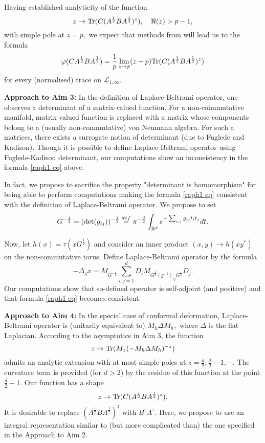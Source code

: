 \documentclass{article}
\begin{document}
Having established analyticity of the function
$$z\to {\rm Tr}(C(A^{\frac12}BA^{\frac12})^z),\quad \Re(z)>p-1,$$
with simple pole at $z=p,$ we expect that methods from \cite{SUZ-indiana} will lead us to the formula
$$\varphi(CA^{\frac12}BA^{\frac12})=\frac1p\lim_{z\to p}(z-p){\rm Tr}(C(A^{\frac12}BA^{\frac12})^z)$$
for every (normalised) trace on $\mathcal{L}_{1,\infty}.$

{\bf Approach to Aim 3:} In the definition of Laplace-Beltrami operator, one observes a determinant of a matrix-valued function. For a non-coimmutative manifold, matrix-valued function is replaced with a matrix whose components belong to a (usually non-commutative) von Neumann algebra. For such a matrices, there exists a surrogate notion of determinant (due to Fuglede and Kadison). Though it is possible to define Laplace-Beltrami operator using Fuglede-Kadison determinant, our computations show an inconsistency in the formula \eqref{raph1 eq} above.

In fact, we propose to sacrifice the property "determinant is homomorphism" for being able to perform computations making the formula \eqref{raph1 eq} consistent with the definition of Laplace-Beltrami operator. We propose to set 
$$G^{-\frac12}=({\rm det}(g_{ij}))^{-\frac12}\stackrel{def}{=}\pi^{-\frac{d}{2}}\int_{\mathbb{R}^d}e^{-\sum_{i,j}g_{ij}t_it_j}dt.$$

Now, let $h(x)=\tau(xG^{\frac12})$ and consider an inner product $(x,y)\to h(xy^*)$ on the non-commutative torus. Define Laplace-Beltrami operator by the formula
$$-\Delta_g x=M_{G^{-\frac12}}\sum_{i,j=1}^dD_iM_{G^{\frac14}(g^{-1})_{ij}G^{\frac14}}D_j.$$
Our computations show that so-defined operator is self-adjoint (and positive) and that formula \eqref{raph1 eq} becomes consistent.

{\bf Approach to Aim 4:} In the special case of conformal deformation, Laplace-Beltrami operator is (unitarily equivalent to) $M_h\Delta M_h,$ where $\Delta$ is the flat Laplacian. According to the asymptotics in Aim 3, the function
$$z\to {\rm Tr}(M_x(-M_h\Delta M_h)^{-z})$$
admits an analytic extension with at most simple poles at $z=\frac{d}{2},\frac{d}{2}-1,\cdots.$ The curvature term is provided (for $d>2$) by the residue of this function at the point $\frac{d}{2}-1.$ Our function has a shape
$$z\to {\rm Tr}(C(A^{\frac12}BA^{\frac12})^z).$$
It is desirable to replace $(A^{\frac12}BA^{\frac12})^z$ with $B^zA^z.$ Here, we propose to use an integral representation similar to (but more complicated than) the one specified in  the Approach to Aim 2.
\end{document}
